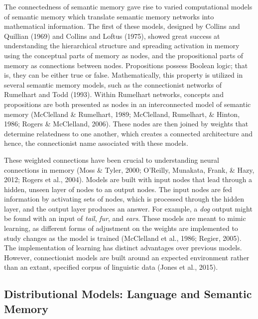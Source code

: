 \documentclass[english,man]{apa6}
\theoremstyle{definition}
\theoremstyle{definition}
\theoremstyle{definition}
\theoremstyle{remark}
\begin{document}
The connectedness of semantic memory gave rise to varied computational
models of semantic memory which translate semantic memory networks into
mathematical information. The first of these models, designed by Collins
and Quillian (1969) and Collins and Loftus (1975), showed great success
at understanding the hierarchical structure and spreading activation in
memory using the conceptual parts of memory as nodes, and the
propositional parts of memory as connections between nodes. Propositions
possess Boolean logic; that is, they can be either true or false.
Mathematically, this property is utilized in several semantic memory
models, such as the connectionist networks of Rumelhart and Todd (1993).
Within Rumelhart networks, concepts and propositions are both presented
as nodes in an interconnected model of semantic memory (McClelland \&
Rumelhart, 1989; McClelland, Rumelhart, \& Hinton, 1986; Rogers \&
McClelland, 2006). These nodes are then joined by weights that determine
relatedness to one another, which creates a connected architecture and
hence, the connectionist name associated with these models.

These weighted connections have been crucial to understanding neural
connections in memory (Moss \& Tyler, 2000; O'Reilly, Munakata, Frank,
\& Hazy, 2012; Rogers et al., 2004). Models are built with input nodes
that lead through a hidden, unseen layer of nodes to an output nodes.
The input nodes are fed information by activating sets of nodes, which
is processed through the hidden layer, and the output layer produces an
answer. For example, a \emph{dog} output might be found with an input of
\emph{tail}, \emph{fur}, and \emph{ears}. These models are meant to
mimic learning, as different forms of adjustment on the weights are
implemented to study changes as the model is trained (McClelland et al.,
1986; Regier, 2005). The implementation of learning has distinct
advantages over previous models. However, connectionist models are built
around an expected environment rather than an extant, specified corpus
of linguistic data (Jones et al., 2015). \newline

\subsection{Distributional Models: Language and Semantic
Memory}\label{distributional-models-language-and-semantic-memory}
\end{document}
